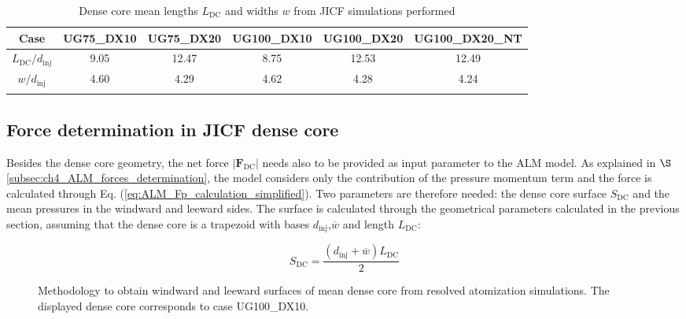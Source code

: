 \begin{table}[!h]
\centering
\caption{Dense core mean lengths $L_\mathrm{DC}$ and widths $w$ from JICF simulations performed}
\begin{tabular}{cccccc}
\thickhline
\textbf{Case} &  UG75\_DX10 & UG75\_DX20 & UG100\_DX10 & UG100\_DX20 &  UG100\_DX20\_NT \\
\hline
$L_\mathrm{DC}/d_\mathrm{inj}$ & 9.05 & 12.47 & 8.75 & 12.53 & 12.49 \\
$w/d_\mathrm{inj}$ & 4.60 & 4.29 & 4.62 & 4.28 & 4.24 \\
\thickhline
\end{tabular}
\label{tab:jicf_L_DC_values}
\end{table}






%

\subsection{Force determination in JICF dense core}
\label{eq:ch5_subsec_force_determination_JICF}

Besides the dense core geometry, the net force $|\textbf{F}_\mathrm{DC}|$ needs also to be provided as input parameter to the ALM model. As explained in $\S$\ref{subsec:ch4_ALM_forces_determination}, the model considers only the contribution of the pressure momentum term and the force is calculated through Eq. (\ref{eq:ALM_Fp_calculation_simplified}). Two parameters are therefore needed: the dense core surface $S_\mathrm{DC}$ and the mean pressures in the windward and leeward sides. The surface is calculated through the geometrical parameters calculated in the previous section, assuming that the dense core is a trapezoid with bases $d_\mathrm{inj}$,$\overline{w}$ and length $L_\mathrm{DC}$:

\begin{equation}
S_\mathrm{DC} = \frac{\left( d_\mathrm{inj} + \overline{w} \right) L_\mathrm{DC} }{2} 
\end{equation}

\begin{figure}[ht]
\centering
{}
\caption[Methodology to obtain windward and leeward surfaces of mean dense core from resolved atomization simulations]{Methodology to obtain windward and leeward surfaces of mean dense core from resolved atomization simulations. The displayed dense core corresponds to case UG100\_DX10.}
\label{fig:extraction_methodology_mean_DC}
\end{figure}

